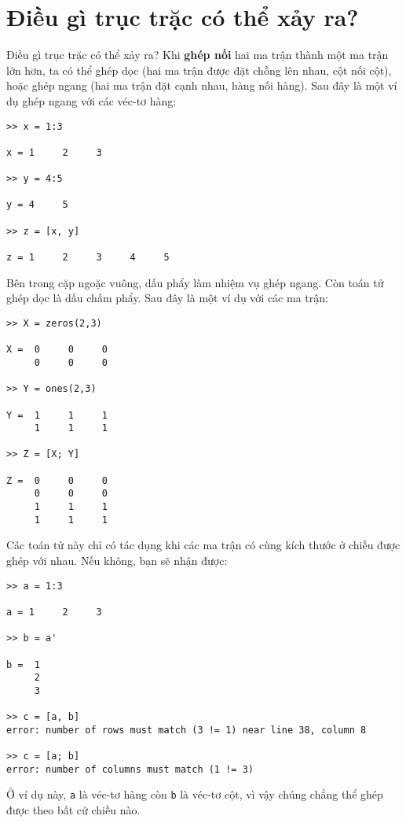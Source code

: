 \documentclass[12pt]{book}
\begin{document}
\section{Điều gì trục trặc có thể xảy ra?}


Điều gì trục trặc có thể xảy ra? Khi {\bf ghép nối} hai ma trận
thành một ma trận lớn hơn, ta có thể ghép dọc (hai ma trận
được đặt chồng lên nhau, cột nối cột), hoặc ghép ngang (hai
ma trận đặt cạnh nhau, hàng nối hàng). 
Sau đây là một ví dụ ghép ngang với các véc-tơ hàng:

\begin{verbatim}
>> x = 1:3

x = 1     2     3

>> y = 4:5

y = 4     5

>> z = [x, y]

z = 1     2     3     4     5
\end{verbatim}
%
Bên trong cặp ngoặc vuông, dấu phẩy làm nhiệm vụ ghép ngang.
Còn toán tử ghép dọc là dấu chấm phẩy. Sau đây là một ví dụ với
các ma trận:

\begin{verbatim}
>> X = zeros(2,3)

X =  0     0     0
     0     0     0

>> Y = ones(2,3)

Y =  1     1     1
     1     1     1

>> Z = [X; Y]

Z =  0     0     0
     0     0     0
     1     1     1
     1     1     1
\end{verbatim}
%
Các toán tử này chỉ có tác dụng khi các ma trận có cùng kích thước
ở chiều được ghép với nhau. Nếu không, bạn sẽ nhận được:

\begin{verbatim}
>> a = 1:3

a = 1     2     3

>> b = a'

b =  1
     2
     3

>> c = [a, b]
error: number of rows must match (3 != 1) near line 38, column 8

>> c = [a; b]
error: number of columns must match (1 != 3)
\end{verbatim}
%
Ở ví dụ này, {\tt a} là véc-tơ hàng còn {\tt b} là véc-tơ cột,
vì vậy chúng chẳng thể ghép được theo bất cứ chiều nào.
\end{document}
